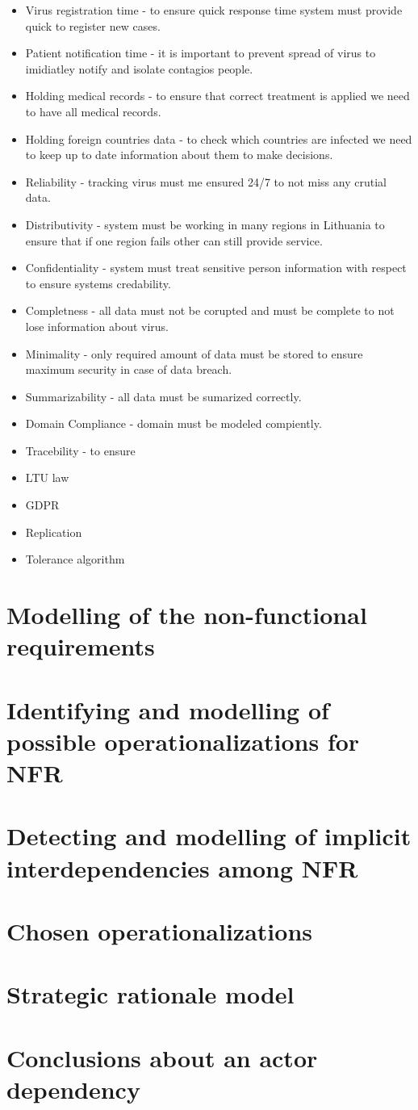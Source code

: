 \documentclass{VUMIFPSkursinis}
\begin{document}
	\begin{itemize}
		\item{Virus registration time - to ensure quick response time system must provide quick to register new cases. }
		\item{Patient notification time - it is important to prevent spread of virus to imidiatley notify and isolate contagios people.}
		\item{Holding medical records - to ensure that correct treatment is applied we need to have all medical records. }
		\item{Holding foreign countries data - to check which countries are infected we need to keep up to date information about them to make decisions.}
		\item{Reliability - tracking virus must me ensured 24/7 to not miss any crutial data.}
		\item{Distributivity - system must be working in many regions in Lithuania to ensure that if one region fails other can still provide service.}
		\item{Confidentiality - system must treat sensitive person information with respect to ensure systems credability.}
		\item{Completness - all data must not be corupted and must be complete to not lose information about virus.}
		\item{Minimality - only required amount of data must be stored to ensure maximum security in case of data breach.}
		\item{Summarizability - all data must be sumarized correctly.} 
		\item{Domain Compliance - domain must be modeled compiently.}
		\item{Tracebility - to ensure }
		\item{LTU law}
		\item{GDPR}
		\item{Replication}
		\item{Tolerance algorithm}
	\end{itemize}

\section{Modelling of the non-functional requirements}

\section{Identifying and modelling of possible operationalizations for NFR}

\section{Detecting and modelling of implicit interdependencies among NFR}

\section{Chosen operationalizations}

\section{Strategic rationale model}

\section{Conclusions about an actor dependency}

\end{document}
